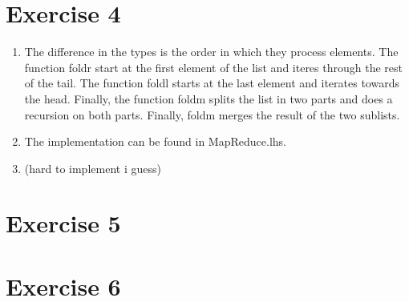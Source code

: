 \documentclass{article}
\begin{document}
\section*{Exercise 4}
\begin{enumerate}
  \item The difference in the types is the order in which they process elements. The function foldr start at the first element of the list and iteres through the rest of the tail. The function foldl starts at the last element and iterates towards the head. Finally, the function foldm splits the list in two parts and does a recursion on both parts. Finally, foldm merges the result of the two sublists.
  \item The implementation can be found in MapReduce.lhs.
  \item (hard to implement i guess)
\end{enumerate}
\section*{Exercise 5}
\section*{Exercise 6}
\end{document}
